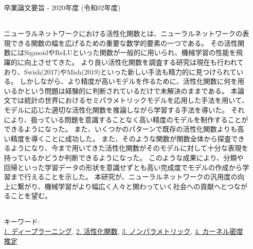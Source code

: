 卒業論文要旨 - 2020年度 (令和02年度)
\begin{center}
\begin{large}
\end{large}
\end{center}

~ \\



ニューラルネットワークにおける活性化関数とは、ニューラルネットワークの表現できる関数の幅を広げるための重要な数学的要素の一つである。
その活性関数にはSigmoidやReLUといった関数が一般的に用いられ、機械学習の性能を飛躍的に向上させてきた。
より良い活性化関数を調査する研究は現在も行われており、Swish(2017)やMish(2019)といった新しい手法も精力的に見つけられている。
しかしながら、より精度が高いモデルを作るために、活性化関数に何を用いるかという問題は経験的に判断されているだけで未解決のままである。
本論文では統計の世界におけるセミパラメトリックモデルを応用した手法を用いて、モデルに応じた適切な活性化関数を推論しながら学習する手法を導いた。
それにより、扱っている問題を意識することなく高い精度のモデルを制作することができるようになった。
また、いくつかのパターンで既存の活性化関数よりも高い精度を導くことに成功した。
また、そのような関数が関数全体から探査できるようになり、今まで用いてきた活性化関数がそのモデルに対して十分な表現を持っているかどうか判断できるようになった。
このような成果により、分類や回帰といった学習データの形状を意識せずとも高い完成度でモデルの作成から学習まで行えることを示した。
本研究が、ニューラルネットワークの汎用度の向上に繋がり、機械学習がより幅広く人々と関わっていく社会への貢献へとつながることを望む。


~ \\
キーワード:\\
\underline{1. ディープラーニング},
\underline{2. 活性化関数},
\underline{3. ノンパラメトリック},
\underline{4. カーネル密度推定}
\begin{flushright}
\dept \\
\author
\end{flushright}
